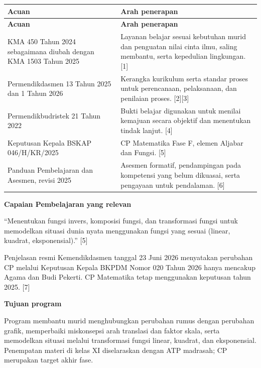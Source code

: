 \documentclass[11pt,a4paper]{article}
\begin{document}
{\small\setlength{\tabcolsep}{2mm}\renewcommand{\arraystretch}{1.35}\begin{longtable}{|>{\raggedright\arraybackslash}p{60.554mm}|>{\raggedright\arraybackslash}p{108.996mm}|}\hline
\rowcolor{gray!10}\textbf{Acuan} & \textbf{Arah penerapan}\\ \hline
\endfirsthead
\rowcolor{gray!10}\textbf{Acuan} & \textbf{Arah penerapan}\\ \hline
\endhead
KMA 450 Tahun 2024 sebagaimana diubah dengan KMA 1503 Tahun 2025 & Layanan belajar sesuai kebutuhan murid dan penguatan nilai cinta ilmu, saling membantu, serta kepedulian lingkungan. [1]\\ \hline
Permendikdasmen 13 Tahun 2025 dan 1 Tahun 2026 & Kerangka kurikulum serta standar proses untuk perencanaan, pelaksanaan, dan penilaian proses. [2][3]\\ \hline
Permendikbudristek 21 Tahun 2022 & Bukti belajar digunakan untuk menilai kemajuan secara objektif dan menentukan tindak lanjut. [4]\\ \hline
Keputusan Kepala BSKAP 046/H/KR/2025 & CP Matematika Fase F, elemen Aljabar dan Fungsi. [5]\\ \hline
Panduan Pembelajaran dan Asesmen, revisi 2025 & Asesmen formatif, pendampingan pada kompetensi yang belum dikuasai, serta pengayaan untuk pendalaman. [6]\\ \hline
\end{longtable}}\medskip
\par\medskip\noindent\textbf{Capaian Pembelajaran yang relevan}\par\smallskip
“Menentukan fungsi invers, komposisi fungsi, dan transformasi fungsi untuk memodelkan situasi dunia nyata menggunakan fungsi yang sesuai (linear, kuadrat, eksponensial).” [5]\par\medskip
{\small Penjelasan resmi Kemendikdasmen tanggal 23 Juni 2026 menyatakan perubahan CP melalui Keputusan Kepala BKPDM Nomor 020 Tahun 2026 hanya mencakup Agama dan Budi Pekerti. CP Matematika tetap menggunakan keputusan tahun 2025. [7]\par}\medskip
\par\medskip\noindent\textbf{Tujuan program}\par\smallskip
Program membantu murid menghubungkan perubahan rumus dengan perubahan grafik, memperbaiki miskonsepsi arah translasi dan faktor skala, serta memodelkan situasi melalui transformasi fungsi linear, kuadrat, dan eksponensial. Penempatan materi di kelas XI diselaraskan dengan ATP madrasah; CP merupakan target akhir fase.\par\medskip
\end{document}
